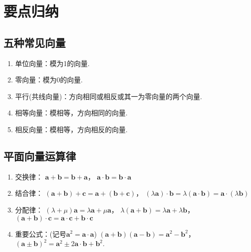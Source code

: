   \Teach{}
  \newtheorem*{Theorem}{定理}
  \makefront
\vspace{-1.5em}
\startexercise
\section{要点归纳}
  \subsection{五种常见向量}
    \begin{enumerate}[label=\arabic*)]
      \item 单位向量：模为1的向量.
      \item 零向量：模为0的向量.
      \item 平行(共线向量)：方向相同或相反或其一为零向量的两个向量.
      \item 相等向量：模相等，方向相同的向量.
      \item 相反向量：模相等，方向相反的向量.
    \end{enumerate}
  \subsection{平面向量运算律}
    \begin{enumerate}[label=\arabic*)]
      \item 交换律：
        $\bm a+\bm b=\bm b+\bm a$，\quad
        $\bm a\cdot\bm b=\bm b\cdot\bm a$
      \item 结合律：
        $(\bm{a}+\bm{b})+\bm{c}=\bm{a}+(\bm{b}+\bm{c})$，\quad
        $(\lambda \bm a)\cdot\bm{b}=\lambda(\bm a\cdot\bm b)=\bm{a}\cdot(\lambda\bm{b})$
      \item 分配律：
        $(\lambda+\mu)\bm{a}=\lambda\bm{a}+\mu\bm{a}$，\quad
        $\lambda(\bm{a}+\bm{b})=\lambda\bm{a}+\lambda\bm{b}$，\quad
        $(\bm a+\bm b)\cdot \bm c=\bm a\cdot\bm c+\bm b\cdot \bm c$
      \item 重要公式：(记号$\bm a^2=\bm a\cdot\bm a$)
        $(\bm a+\bm b)(\bm a-\bm b)=\bm a^2-\bm b^2$，\quad
        $(\bm a\pm\bm b)^2=\bm a^2\pm2\bm a\cdot\bm b+\bm b^2$.
    \end{enumerate}
